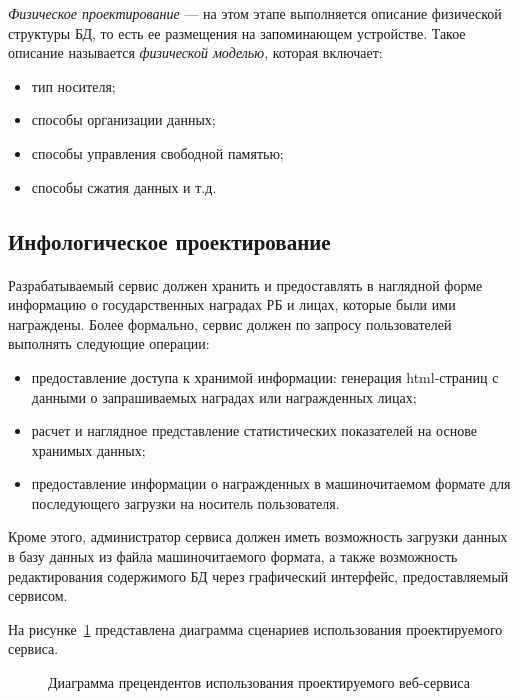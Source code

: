 \textit{Физическое проектирование} --- на этом этапе выполняется описание физической
структуры БД, то есть ее размещения на запоминающем устройстве.
Такое описание называется \textit{физической моделью}, которая включает:

\begin{itemize}
\item
  тип носителя;
\item
  способы организации данных;
\item
  способы управления свободной памятью;
\item
  способы сжатия данных и т.д.
\end{itemize}

\subsection{Инфологическое проектирование}
\label{ssub:db_info_stage}

\paragraph{}
Разрабатываемый сервис должен хранить и предоставлять в наглядной форме 
информацию о государственных наградах РБ и лицах, которые были ими награждены.
Более формально, сервис должен по запросу пользователей выполнять следующие операции:
\begin{itemize}
\item
  предоставление доступа к хранимой информации: генерация html-страниц с данными
  о запрашиваемых наградах или награжденных лицах;
\item
  расчет и наглядное представление статистических показателей на основе хранимых данных;
\item
  предоставление информации о награжденных в машиночитаемом формате для последующего 
  загрузки на носитель пользователя. 
\end{itemize}

Кроме этого, администратор сервиса должен иметь возможность загрузки данных в базу данных
из файла машиночитаемого формата, а также возможность редактирования содержимого БД
через графический интерфейс, предоставляемый сервисом.

На рисунке~\ref{fig:use-case_diagram} представлена диаграмма сценариев
использования проектируемого сервиса.

\begin{figure}[h!]
  \centering
  \small{
    
  }
  \caption{Диаграмма прецендентов использования проектируемого веб-сервиса}
  \label{fig:use-case_diagram}
\end{figure}


